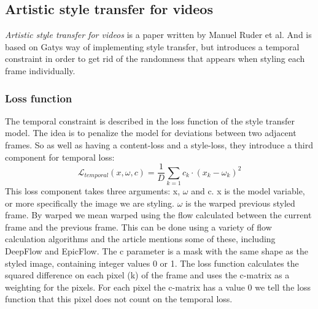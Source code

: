 \subsection{Artistic style transfer for videos}
\label{seq:ruder}
\textit{Artistic style transfer for videos} is a paper written by Manuel Ruder et al. \cite{Ruder:1} And is based on Gatys \cite{Gatys:1} way of implementing style transfer, but introduces a temporal constraint in order to get rid of the randomness that appears when styling each frame individually. \nextline
\subsubsection{Loss function}
The temporal constraint is described in the loss function of the style transfer model. The idea is to penalize the model for deviations between two adjacent frames. So as well as having a content-loss and a style-loss, they introduce a third component for temporal loss: 
\begin{equation}
\mathcal{L}_{temporal}(x, \omega, c) = \frac{1}{D}\sum_{k=1} c_k \cdot (x_k - \omega_k)^2
\end{equation}
\nextline This loss component takes three arguments: x, $\omega$ and c. x is the model variable, or more specifically the image we are styling. $\omega$ is the warped previous styled frame. By warped we mean warped using the flow calculated between the current frame and the previous frame. This can be done using a variety of flow calculation algorithms and the article mentions some of these, including DeepFlow and EpicFlow. The c parameter is a mask with the same shape as the styled image, containing integer values 0 or 1. The loss function calculates the squared difference on each pixel (k) of the frame and uses the c-matrix as a weighting for the pixels. For each pixel the c-matrix has a value 0 we tell the loss function that this pixel does not count on the temporal loss.

